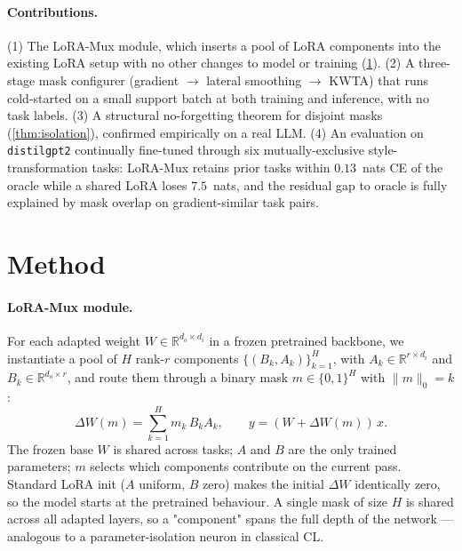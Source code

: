 \documentclass{article}
\theoremstyle{plain}
\theoremstyle{remark}
\begin{document}
\paragraph{Contributions.} (1) The LoRA-Mux module, which inserts a pool of LoRA components into the existing LoRA setup with no other changes to model or training (\cref{sec:method}). (2) A three-stage mask configurer (gradient $\to$ lateral smoothing $\to$ KWTA) that runs cold-started on a small support batch at both training and inference, with no task labels. (3) A structural no-forgetting theorem for disjoint masks (\cref{thm:isolation}), confirmed empirically on a real LLM. (4) An evaluation on \texttt{distilgpt2} continually fine-tuned through six mutually-exclusive style-transformation tasks: LoRA-Mux retains prior tasks within $0.13$~nats CE of the oracle while a shared LoRA loses $7.5$~nats, and the residual gap to oracle is fully explained by mask overlap on gradient-similar task pairs.

\section{Method}
\label{sec:method}

\paragraph{LoRA-Mux module.}
For each adapted weight $W \in \mathbb{R}^{d_o\times d_i}$ in a frozen pretrained backbone, we instantiate a pool of $H$ rank-$r$ components $\{(B_k,A_k)\}_{k=1}^{H}$, with $A_k\in\mathbb{R}^{r\times d_i}$ and $B_k\in\mathbb{R}^{d_o\times r}$, and route them through a binary mask $m\in\{0,1\}^H$ with $\|m\|_0 = k$:
\begin{equation}
\Delta W(m) = \sum_{k=1}^{H} m_k\, B_k A_k, \qquad y = (W + \Delta W(m))\,x.
\end{equation}
The frozen base $W$ is shared across tasks; $A$ and $B$ are the only trained parameters; $m$ selects which components contribute on the current pass. Standard LoRA init ($A$ uniform, $B$ zero) makes the initial $\Delta W$ identically zero, so the model starts at the pretrained behaviour. A single mask of size $H$ is shared across all adapted layers, so a "component" spans the full depth of the network — analogous to a parameter-isolation neuron in classical CL.
\end{document}
